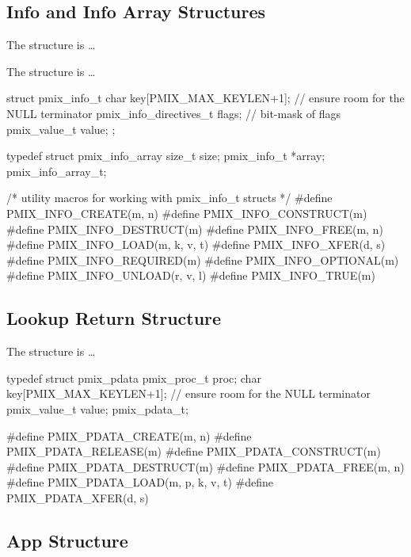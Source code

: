 \subsection{Info and Info Array Structures}

The  structure is \ldots

The  structure is \ldots

\cspecificstart
\begin{codepar}
struct pmix_info_t {
    char key[PMIX_MAX_KEYLEN+1];    // ensure room for the NULL terminator
    pmix_info_directives_t flags;   // bit-mask of flags
    pmix_value_t value;
};

typedef struct pmix_info_array {
    size_t size;
    pmix_info_t *array;
} pmix_info_array_t;

/* utility macros for working with pmix_info_t structs */
#define PMIX_INFO_CREATE(m, n)
#define PMIX_INFO_CONSTRUCT(m)
#define PMIX_INFO_DESTRUCT(m)
#define PMIX_INFO_FREE(m, n)
#define PMIX_INFO_LOAD(m, k, v, t)
#define PMIX_INFO_XFER(d, s)
#define PMIX_INFO_REQUIRED(m)
#define PMIX_INFO_OPTIONAL(m)
#define PMIX_INFO_UNLOAD(r, v, l)
#define PMIX_INFO_TRUE(m)
\end{codepar}
\cspecificend


\subsection{Lookup Return Structure}

The  structure is \ldots

\cspecificstart
\begin{codepar}
typedef struct pmix_pdata {
    pmix_proc_t proc;
    char key[PMIX_MAX_KEYLEN+1];  // ensure room for the NULL terminator
    pmix_value_t value;
} pmix_pdata_t;

#define PMIX_PDATA_CREATE(m, n)
#define PMIX_PDATA_RELEASE(m)
#define PMIX_PDATA_CONSTRUCT(m)
#define PMIX_PDATA_DESTRUCT(m)
#define PMIX_PDATA_FREE(m, n)
#define PMIX_PDATA_LOAD(m, p, k, v, t)
#define PMIX_PDATA_XFER(d, s)
\end{codepar}
\cspecificend


\subsection{App Structure}


